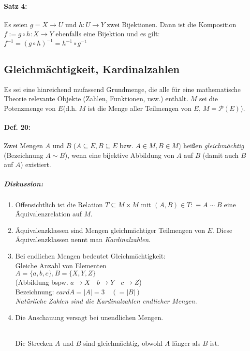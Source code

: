\paragraph{Satz 4:} \parskp
Es seien $g=X\rightarrow U$ und $h: U\rightarrow Y$ zwei Bijektionen. Dann ist die Komposition $f:= g \circ h : X\rightarrow Y$ ebenfalls eine Bijektion und es gilt:\\
$\boxed{f^{-1}=(g\circ h)^{-1}=h^{-1}\circ g^{-1}}$

\subsection{Gleichmächtigkeit, Kardinalzahlen}

Es sei eine hinreichend mufassend Grundmenge, die alle für eine mathematische Theorie relevante Objekte (Zahlen, Funktionen, usw.) enthält. $M$ sei die Potenzmenge von $E$(d.h. $M$ ist die Menge aller Teilmengen von $E$, $M=\mathcal{P}(E)$).

\paragraph{Def. 20:} \parskp
Zwei Mengen $A$ und $B$ ($A \subseteq E, B\subseteq E$ bzw. $A \in M, B \in M$) heißen \emph{gleichmächtig} (Bezeichnung $A\sim B$), wenn eine bijektive Abbildung von $A$ auf $B$ (damit auch $B$ auf $A$) existiert.

\subparagraph{Diskussion:}
\begin{enumerate}
\item Offensichtlich ist die Relation $T\subseteq M \times M$ mit $(A,B) \in T : \equiv A \sim B$ eine Äquivalenzrelation auf $M$.
\item Äquivalenzklassen sind Mengen gleichmächtiger Teilmengen von $E$. Diese Äquivalenzklassen nennt man \emph{Kardinalzahlen}.
\item Bei endlichen Mengen bedeutet Gleichmächtigkeit: \\
Gleiche Anzahl von Elementen \\
$A = \{a, b,c\}, B=\{X,Y,Z\}$ \\
(Abbildung bspw. $a \rightarrow X \quad b\rightarrow Y \quad c\rightarrow Z$)\\
Bezeichnung: $card A = |A| = 3 \quad (=|B|)$\\
\emph{Natürliche Zahlen sind die Kardinalzahlen endlicher Mengen.}
\item Die Anschauung versagt bei unendlichen Mengen.\\
\\
Die Strecken $A$ und $B$ sind gleichmächtig, obwohl $A$ länger als $B$ ist.
\end{enumerate}


